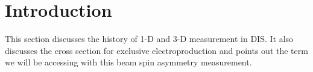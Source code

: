 \section{Introduction}
This section discusses the history of 1-D and 3-D measurement in DIS.  It also discusses the cross section for exclusive electroproduction and points out the term we will be accessing with this beam spin asymmetry measurement.  